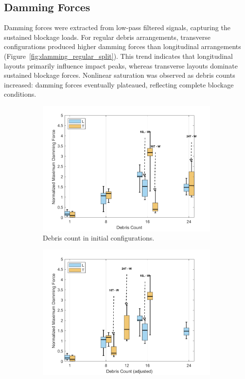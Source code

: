 \documentclass{article}
\begin{document}
\subsection{Damming Forces} 
Damming forces were extracted from low-pass filtered signals, capturing the sustained blockage loads. For regular debris arrangements, transverse configurations produced higher damming forces than longitudinal arrangements  (Figure~\ref{fig:damming_regular_split}). This trend indicates that longitudinal layouts primarily influence impact peaks, whereas transverse layouts dominate sustained blockage forces. Nonlinear saturation was observed as debris counts increased: damming forces eventually plateaued, reflecting complete blockage conditions.

\begin{figure}[htbp]
    \centering
    \begin{subfigure}[t]{0.9\textwidth}
        \centering
        \includegraphics[width=\textwidth]{Damming_Regular_SplitByTrial.png}
        \caption{Debris count in initial configurations.}
        \label{fig:damming_regular_original}
    \end{subfigure}
    \hfill
    \begin{subfigure}[t]{0.9\textwidth}
        \centering
        \includegraphics[width=\textwidth]{Damming_Regular_L_T_SplitByTrial_Remapped.png}

\end{subfigure}
\end{figure}
\end{document}
